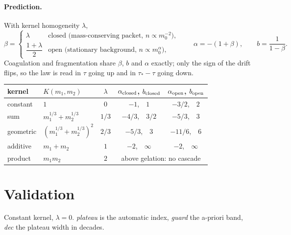 \documentclass[a4paper,12pt]{article}
\begin{document}
\paragraph{Prediction.} With kernel homogeneity $\lambda$,
\begin{equation}
  \beta =
    \begin{cases}
      \lambda & \text{closed (mass-conserving packet, } n \propto m_0^{-2}),\\[2pt]
      \dfrac{1+\lambda}{2} & \text{open (stationary background, } n \propto m_0^{\alpha}),
    \end{cases}
  \qquad
  \alpha = -(1+\beta),
  \qquad
  b = \frac{1}{1-\beta}.
\end{equation}
Coagulation and fragmentation share $\beta$, $b$ and $\alpha$ exactly; only
the sign of the drift flips, so the law is read in $\tau$ going up and in
$\tau_\ast - \tau$ going down.

\begin{center}
\footnotesize
\begin{tabular}{@{}l l c c c@{}}
\toprule
kernel & $K(m_1,m_2)$ & $\lambda$ &
  $\alpha_{\rm closed}$, $b_{\rm closed}$ &
  $\alpha_{\rm open}$, $b_{\rm open}$ \\
\midrule
constant   & $1$                                & $0$   & $-1$,\ \ $1$    & $-3/2$,\ \ $2$ \\
sum        & $m_1^{1/3}+m_2^{1/3}$              & $1/3$ & $-4/3$,\ \ $3/2$& $-5/3$,\ \ $3$ \\
geometric  & $(m_1^{1/3}+m_2^{1/3})^2$          & $2/3$ & $-5/3$,\ \ $3$  & $-11/6$,\ \ $6$ \\
additive   & $m_1+m_2$                          & $1$   & $-2$,\ \ $\infty$ & $-2$,\ \ $\infty$ \\
product    & $m_1 m_2$                          & $2$   & \multicolumn{2}{c}{above gelation: no cascade} \\
\bottomrule
\end{tabular}
\end{center}

\section{Validation}
\label{sec:num_validation}

Constant kernel, $\lambda = 0$. \emph{plateau} is the automatic index,
\emph{guard} the a-priori band, \emph{dec} the plateau width in decades.
\end{document}
